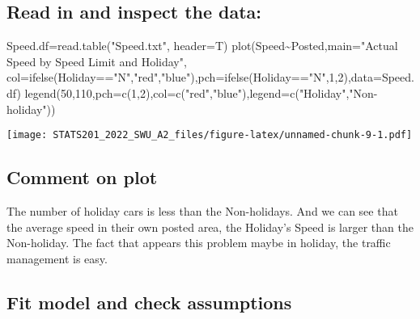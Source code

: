 \documentclass[
]{article}
\newenvironment{Shaded}{\begin{snugshade}}{\end{snugshade}}
\newcommand{\AttributeTok}[1]{\textcolor[rgb]{0.77,0.63,0.00}{#1}}
\newcommand{\DecValTok}[1]{\textcolor[rgb]{0.00,0.00,0.81}{#1}}
\newcommand{\FunctionTok}[1]{\textcolor[rgb]{0.00,0.00,0.00}{#1}}
\newcommand{\NormalTok}[1]{#1}
\newcommand{\OtherTok}[1]{\textcolor[rgb]{0.56,0.35,0.01}{#1}}
\newcommand{\SpecialCharTok}[1]{\textcolor[rgb]{0.00,0.00,0.00}{#1}}
\newcommand{\StringTok}[1]{\textcolor[rgb]{0.31,0.60,0.02}{#1}}
\begin{document}
\hypertarget{read-in-and-inspect-the-data}{%
\subsection{Read in and inspect the
data:}\label{read-in-and-inspect-the-data}}

\begin{Shaded}
\begin{Highlighting}[]
\NormalTok{Speed.df}\OtherTok{=}\FunctionTok{read.table}\NormalTok{(}\StringTok{"Speed.txt"}\NormalTok{, }\AttributeTok{header=}\NormalTok{T)}
\FunctionTok{plot}\NormalTok{(Speed}\SpecialCharTok{\textasciitilde{}}\NormalTok{Posted,}\AttributeTok{main=}\StringTok{"Actual Speed by Speed Limit and Holiday"}\NormalTok{, }\AttributeTok{col=}\FunctionTok{ifelse}\NormalTok{(Holiday}\SpecialCharTok{==}\StringTok{"N"}\NormalTok{,}\StringTok{"red"}\NormalTok{,}\StringTok{"blue"}\NormalTok{),}\AttributeTok{pch=}\FunctionTok{ifelse}\NormalTok{(Holiday}\SpecialCharTok{==}\StringTok{"N"}\NormalTok{,}\DecValTok{1}\NormalTok{,}\DecValTok{2}\NormalTok{),}\AttributeTok{data=}\NormalTok{Speed.df)}
\FunctionTok{legend}\NormalTok{(}\DecValTok{50}\NormalTok{,}\DecValTok{110}\NormalTok{,}\AttributeTok{pch=}\FunctionTok{c}\NormalTok{(}\DecValTok{1}\NormalTok{,}\DecValTok{2}\NormalTok{),}\AttributeTok{col=}\FunctionTok{c}\NormalTok{(}\StringTok{"red"}\NormalTok{,}\StringTok{"blue"}\NormalTok{),}\AttributeTok{legend=}\FunctionTok{c}\NormalTok{(}\StringTok{"Holiday"}\NormalTok{,}\StringTok{"Non{-}holiday"}\NormalTok{))}
\end{Highlighting}
\end{Shaded}

\texttt{[image: STATS201\_2022\_SWU\_A2\_files/figure-latex/unnamed-chunk-9-1.pdf]}

\hypertarget{comment-on-plot}{%
\subsection{Comment on plot}\label{comment-on-plot}}

The number of holiday cars is less than the Non-holidays. And we can see
that the average speed in their own posted area, the Holiday's Speed is
larger than the Non-holiday. The fact that appears this problem maybe in
holiday, the traffic management is easy.

\hypertarget{fit-model-and-check-assumptions}{%
\subsection{Fit model and check
assumptions}\label{fit-model-and-check-assumptions}}
\end{document}
